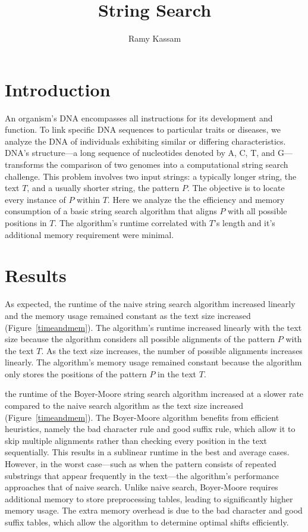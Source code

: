 \documentclass[11pt, letterpaper]{article}
\begin{document}
\title{String Search}
\author{Ramy Kassam}
\maketitle

\section{Introduction}
An organism's DNA encompasses all instructions for its development and
function. To link specific DNA sequences to particular traits or diseases, we
analyze the DNA of individuals exhibiting similar or differing characteristics.
DNA's structure—a long sequence of nucleotides denoted by A, C, T, and
G—transforms the comparison of two genomes into a computational string search
challenge. This problem involves two input strings: a typically longer string,
the text $T$, and a usually shorter string, the pattern $P$. The
objective is to locate every instance of $P$ within $T$. Here we analyze the
the efficiency and memory consumption of a basic string search algorithm that
aligns $P$ with all possible positions in $T$.  The algorithm's runtime
correlated with $T$'s length and it's additional memory requirement were
minimal.

\section{Results}

As expected, the runtime of the naive string search algorithm increased
linearly and the memory usage remained constant as the text size increased
(Figure~\ref{timeandmem}). The algorithm's runtime increased linearly with
the text size because the algorithm considers all possible alignments of the
pattern $P$ with the text $T$. As the text size increases, the number of
possible alignments increases linearly. The algorithm's memory usage remained
constant because the algorithm only stores the positions of the pattern $P$ in
the text $T$.

the runtime of the Boyer-Moore string search algorithm increased at a slower rate compared to the naive search algorithm as the text size increased (Figure~\ref{timeandmem}). The Boyer-Moore algorithm benefits from efficient heuristics, namely the bad character rule and good suffix rule, which allow it to skip multiple alignments rather than checking every position in the text sequentially. This results in a sublinear runtime in the best and average cases. However, in the worst case—such as when the pattern consists of repeated substrings that appear frequently in the text—the algorithm's performance approaches that of naive search. Unlike naive search, Boyer-Moore requires additional memory to store preprocessing tables, leading to significantly higher memory usage. The extra memory overhead is due to the bad character and good suffix tables, which allow the algorithm to determine optimal shifts efficiently.
\end{document}
